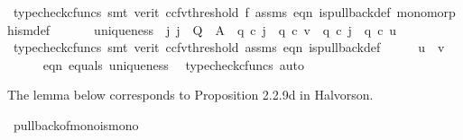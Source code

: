 \begin{isabellebody}
\ {\isacharparenleft}{\kern0pt}typecheck{\isacharunderscore}{\kern0pt}cfuncs{\isacharcomma}{\kern0pt}\ smt\ {\isacharparenleft}{\kern0pt}verit{\isacharcomma}{\kern0pt}\ ccfv{\isacharunderscore}{\kern0pt}threshold{\isacharparenright}{\kern0pt}\ f{}\ assms{\isacharparenleft}{\kern0pt}{}{\isacharcomma}{\kern0pt}{}{\isacharparenright}{\kern0pt}\ eqn{}\ is{\isacharunderscore}{\kern0pt}pullback{\isacharunderscore}{\kern0pt}def\ monomorphism{\isacharunderscore}{\kern0pt}def{}{\isacharparenright}{\kern0pt}\isanewline
\ \ \isamarkupfalse%
\isanewline
\isanewline
\ \ \isamarkupfalse%
\ uniqueness{\isacharcolon}{\kern0pt}\ {\isachardoublequoteopen}{\isasymexists}{\isacharbang}{\kern0pt}\ j{\isachardot}{\kern0pt}\ {\isacharparenleft}{\kern0pt}j\ {\isacharcolon}{\kern0pt}\ Q\ {\isasymrightarrow}\ A\ {\isasymand}\ q{}\ {\isasymcirc}\isactrlsub c\ j\ {\isacharequal}{\kern0pt}\ q{}\ {\isasymcirc}\isactrlsub c\ v\ {\isasymand}\ q{}\ {\isasymcirc}\isactrlsub c\ j\ {\isacharequal}{\kern0pt}\ q{}\ {\isasymcirc}\isactrlsub c\ u{\isacharparenright}{\kern0pt}{\isachardoublequoteclose}\isanewline
\ \ \ \isamarkupfalse%
\ {\isacharparenleft}{\kern0pt}typecheck{\isacharunderscore}{\kern0pt}cfuncs{\isacharcomma}{\kern0pt}\ smt\ {\isacharparenleft}{\kern0pt}verit{\isacharcomma}{\kern0pt}\ ccfv{\isacharunderscore}{\kern0pt}threshold{\isacharparenright}{\kern0pt}\ assms{\isacharparenleft}{\kern0pt}{}{\isacharparenright}{\kern0pt}\ eqn{}\ is{\isacharunderscore}{\kern0pt}pullback{\isacharunderscore}{\kern0pt}def{\isacharparenright}{\kern0pt}\isanewline
\ \ \isamarkupfalse%
\ \isamarkupfalse%
\ {\isachardoublequoteopen}u\ {\isacharequal}{\kern0pt}\ v{\isachardoublequoteclose}\isanewline
\ \ \ \ \isamarkupfalse%
\ eqn{}\ equals\ uniqueness\ \isamarkupfalse%
\ {\isacharparenleft}{\kern0pt}typecheck{\isacharunderscore}{\kern0pt}cfuncs{\isacharcomma}{\kern0pt}\ auto{\isacharparenright}{\kern0pt}\isanewline
{}\isamarkupfalse%
%
\endisatagproof
{\isafoldproof}%
%
\isadelimproof
%
\endisadelimproof
%
\begin{isamarkuptext}%
The lemma below corresponds to Proposition 2.2.9d in Halvorson.%
\end{isamarkuptext}\isamarkuptrue%
\isamarkupfalse%
\ pullback{\isacharunderscore}{\kern0pt}of{\isacharunderscore}{\kern0pt}mono{\isacharunderscore}{\kern0pt}is{\isacharunderscore}{\kern0pt}mono{}{\isacharcolon}{\kern0pt}\isanewline

\end{isabellebody}

